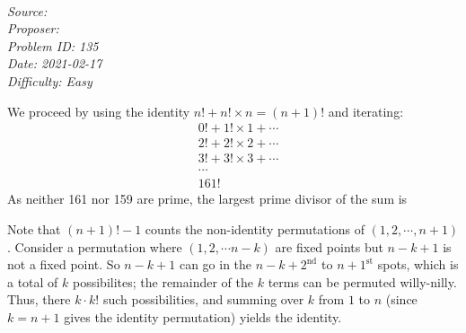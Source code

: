 \SSbreak\\
\emph{Source: \Cfolk}\\
\emph{Proposer: \Pss}\\
\emph{Problem ID: 135}\\
\emph{Date: 2021-02-17}\\
\emph{Difficulty: Easy}\\
\SSbreak
 
\bigskip

\begin{solution}\hfil\medskip

We proceed by using the identity \(n!+n!\times n = (n+1)!\) and iterating:
\begin{align}
    &0!+1!\times 1+\cdots\\
    &2!+2!\times2+\cdots\\
    &3!+3!\times3+\cdots\\
    &\cdots\\
    &161!
\end{align}
As neither 161 nor 159 are prime, the largest prime divisor of the sum is 
\end{solution}\bigskip

\begin{solution}\hfil\medskip

    Note that $(n + 1)! - 1$ counts the non-identity permutations of $(1, 2, \cdots , n + 1)$. 
    Consider a permutation where $(1, 2, \cdots n - k)$ are fixed points but $n - k + 1$ is not a fixed point.
    So $n - k + 1$ can go in the $n - k + 2^{\text{nd}}$ to $n + 1^{\text{st}}$ spots, which is a total of $k$ possibilites;
    the remainder of the $k$ terms can be permuted willy-nilly. Thus, there $k \cdot k!$ such possibilities, and summing over 
    $k$ from $1$ to $n$ (since $k = n + 1$ gives the identity permutation) yields the identity. 
\end{solution}
